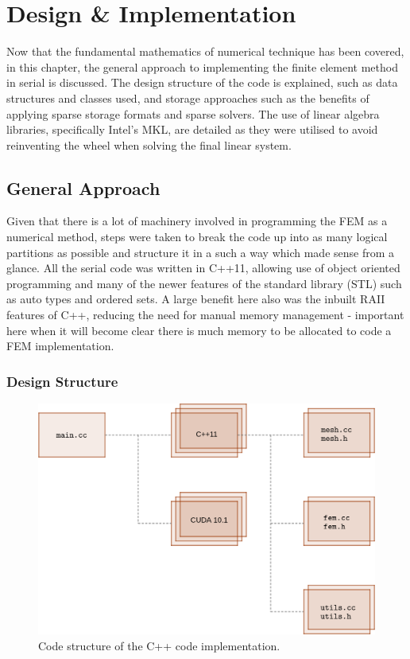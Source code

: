 \clearpage
\chapter{Design \& Implementation}

Now that the fundamental mathematics of numerical technique has been covered, in this chapter, the general approach to implementing the finite element method in serial is discussed. The design structure of the code is explained, such as data structures and classes used, and storage approaches such as the benefits of applying sparse storage formats and sparse solvers. The use of linear algebra libraries, specifically Intel's MKL, are detailed as they were utilised to avoid reinventing the wheel when solving the final linear system. 

\section{General Approach}\label{approach}

Given that there is a lot of machinery involved in programming the FEM as a numerical method, steps were taken to break the code up into as many logical partitions as possible and structure it in a such a way which made sense from a glance. All the serial code was written in C++11, allowing use of object oriented programming and many of the newer features of the standard library (STL) such as auto types and ordered sets. A large benefit here also was the inbuilt RAII features of C++, reducing the need for manual memory management - important here when it will become clear there is much memory to be allocated to code a FEM implementation.

\subsection{Design Structure}
\begin{figure}
	\centering
	\includegraphics[width = 0.7\linewidth]{Figures/cpp_code}
	\caption{Code structure of the C++ code implementation.}
	\label{fig:cpp}
\end{figure}

